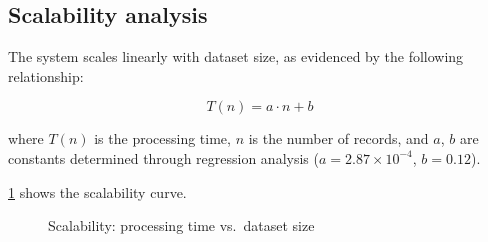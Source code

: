 \subsection{Scalability analysis}

The system scales linearly with dataset size, as evidenced by the following relationship:

\begin{equation} \label{eq:scalability}
    T(n) = a \cdot n + b
\end{equation}

where $T(n)$ is the processing time, $n$ is the number of records, and $a$, $b$ are constants determined through regression analysis ($a = 2.87 \times 10^{-4}$, $b = 0.12$).

\cref{fig:scalability-plot} shows the scalability curve.

\begin{figure}[H]
    \centering
    \caption{Scalability: processing time vs.\ dataset size} \label{fig:scalability-plot}
\end{figure}

\clearpage
